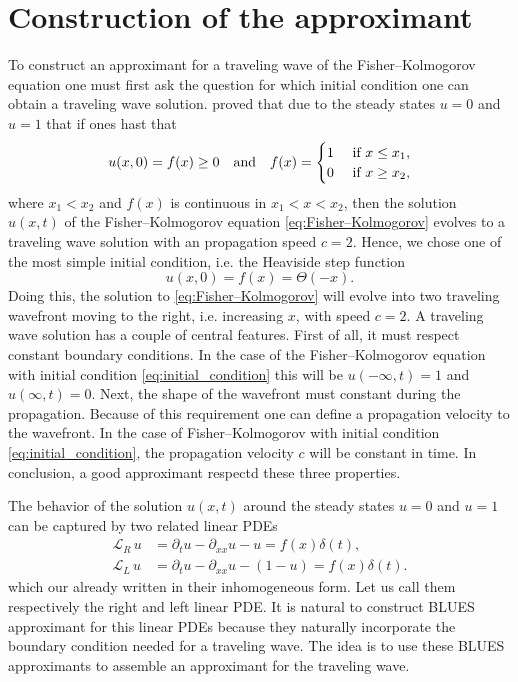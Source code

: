 \documentclass[amsmath,amssymb,amsfonts,aps,pre,preprint,superscriptaddress,bibnotes,showpacs,showkeys,longbibliography]{revtex4-1}
\begin{document}
\section{Construction of the approximant} \label{sec:constructing_approximant}
To construct an approximant for a traveling wave of the Fisher–Kolmogorov equation one must first ask the question for which initial condition one can obtain a traveling wave solution. \citet{kolmogorov1937study} proved that due to the steady states $u=0$ and $u=1$ that if ones hast that
\begin{align}\label{eq:kolmogorov criteria}
	u(x, 0)=f(x) \geq 0 \qq{and} f(x)= \begin{cases}1 & \text { if } x \leq x_{1}, \\ 0 & \text { if } x \geq x_{2},\end{cases}
\end{align}
where $x_{1}<x_{2}$ and $f(x)$ is continuous in $x_{1}<x<x_{2}$, then the solution $u(x, t)$ of the Fisher–Kolmogorov equation \eqref{eq:Fisher–Kolmogorov} evolves to a traveling wave solution with an propagation speed $c=2$. Hence, we chose one of the most simple initial condition, i.e. the Heaviside step function 
\begin{equation}
    \label{eq:initial_condition}
    u(x,0)=f(x)=\Theta(-x).
\end{equation}
Doing this, the solution to \eqref{eq:Fisher–Kolmogorov} will evolve into two traveling wavefront moving to the right, i.e. increasing $x$, with speed $c = 2$. A traveling wave solution has a couple of central features. First of all, it must respect constant boundary conditions. In the case of the Fisher–Kolmogorov equation with initial condition \eqref{eq:initial_condition} this will be $u(-\infty, t)=1$ and $u(\infty, t)=0$. Next, the shape of the wavefront must constant during the propagation. Because of this requirement one can define a propagation velocity to the wavefront. In the case of Fisher–Kolmogorov with initial condition \eqref{eq:initial_condition}, the propagation velocity $c$ will be constant in time. In conclusion, a good approximant respectd these three properties.

The behavior of the solution $u(x,t)$ around the steady states $u=0$ and $u=1$ can be captured by two related linear PDEs
\begin{align}
\label{eq:linear_operator_Right}
    \mathcal{L}_R \, u &= \partial_t u -\partial_{xx}u - u=f(x)\delta(t),\\
    \mathcal{L}_L \,  u &=\partial_t u -\partial_{xx}u - (1-u)=f(x)\delta(t).
    \label{eq:linear_operator_Left}
\end{align}
which our already written in their inhomogeneous form. Let us call them respectively the right and left linear PDE. It is natural to construct BLUES approximant for this linear PDEs because they naturally incorporate the boundary condition needed for a traveling wave. The idea is to use these BLUES approximants to assemble an approximant for the traveling wave.
\end{document}
